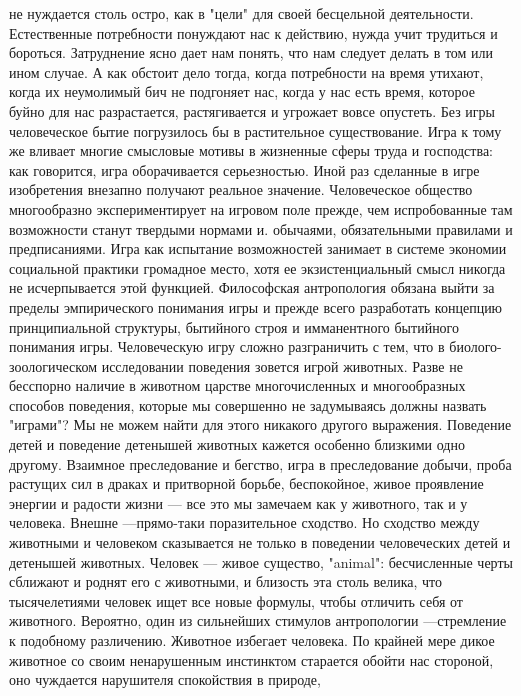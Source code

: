 \documentclass[12pt]{article}
\begin{document}
не  нуждается  столь  остро,  как  в  "цели"  для  своей  бесцельной  деятельности.  Естественные  потребности
понуждают нас к действию, нужда учит трудиться и бороться. Затруднение ясно дает нам понять, что нам
следует делать в том или ином случае. А как обстоит дело тогда, когда потребности на время утихают, когда их
неумолимый бич не подгоняет нас, когда у нас есть время, которое буйно для нас разрастается, растягивается и
угрожает вовсе опустеть. Без игры человеческое бытие погрузилось бы в растительное существование. Игра к
тому  же  вливает  многие  смысловые  мотивы  в  жизненные  сферы  труда  и  господства:  как  говорится,  игра
оборачивается серьезностью. Иной раз сделанные в игре изобретения внезапно получают реальное значение.
Человеческое общество  многообразно экспериментирует  на  игровом поле  прежде,  чем  испробованные там
возможности станут твердыми нормами и. обычаями, обязательными правилами и предписаниями. Игра как
испытание  возможностей  занимает  в  системе  экономии  социальной  практики  громадное  место,  хотя  ее
экзистенциальный смысл никогда не исчерпывается этой функцией. Философская антропология обязана выйти
за пределы эмпирического понимания игры и прежде всего разработать концепцию принципиальной структуры,
бытийного строя и имманентного бытийного понимания игры.
Человеческую игру сложно разграничить с тем, что в
биолого-зоологическом  исследовании  поведения  зовется  игрой  животных.  Разве  не  бесспорно  наличие  в
животном  царстве  многочисленных  и  многообразных  способов  поведения,  которые  мы  совершенно  не
задумываясь должны назвать "играми"? Мы не можем найти для этого никакого другого выражения. Поведение
детей и поведение детенышей животных кажется особенно близкими одно другому. Взаимное преследование и
бегство, игра в преследование добычи, проба растущих сил в драках и притворной борьбе, беспокойное, живое
проявление энергии и радости жизни --- все это мы замечаем как у животного, так и у человека. Внешне ---прямо-таки  поразительное  сходство.  Но  сходство  между  животными  и  человеком  сказывается  не  только  в
поведении человеческих детей и детенышей животных. Человек --- живое существо, "animal": бесчисленные
черты сближают и роднят его с животными, и близость эта столь велика, что тысячелетиями человек ищет все
новые формулы, чтобы отличить себя от животного. Вероятно, один из сильнейших стимулов антропологии ---стремление к подобному различению. Животное избегает человека. По крайней мере дикое животное со своим
ненарушенным инстинктом старается обойти нас стороной, оно чуждается нарушителя спокойствия в природе,
\end{document}
